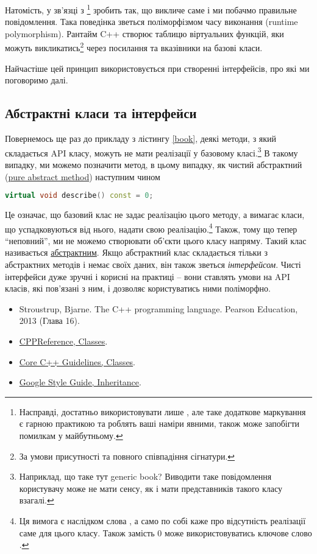 \documentclass[12pt]{article}
\begin{document}
	Натомість,  у зв'язці з \footnote{Насправді, достатньо використовувати лише , але таке додаткове маркування є гарною практикою та роблять ваші наміри явними, також може запобігти помилкам у майбутньому.} зробить так, що  викличе саме  і ми побачмо правильне повідомлення. Така поведінка зветься поліморфізмом часу виконання (runtime polymorphism). Рантайм C++ створює таблицю віртуальних функцій, яки можуть викликатись\footnote{За умови присутності  та повного співпадіння сігнатури.} через посилання та вказівники на базові класи.

	Найчастіше цей принцип використовується при створенні інтерфейсів, про які ми поговоримо далі.

	\subsection{Абстрактні класи та інтерфейси}
	Повернемось ще раз до прикладу з лістингу \ref{book}, деякі методи, з який складається API класу, можуть не мати реалізації у базовому класі.\footnote{Наприклад, що таке тут generic book? Виводити таке повідомлення користувачу може не мати сенсу, як і мати представників такого класу взагалі.} В такому випадку, ми можемо позначити метод,  в цьому випадку, як чистий абстрактний (\href{https://en.cppreference.com/book/intro/abstract_classes}{pure abstract method}) наступним чином
	\begin{lstlisting}[language=c++]
		virtual void describe() const = 0;
	\end{lstlisting}

	Це означає, що базовий клас  не задає реалізацію цього методу, а вимагає класи, що успадковуються від нього, надати свою реалізацію.\footnote{Ця вимога є наслідком слова , а  само по собі каже про відсутність реалізації саме для цього класу. Також замість 0 може використовуватись ключове слово .} Також, тому що  тепер ``неповний'', ми не можемо створювати об'єкти цього класу напряму. Такий клас називається \href{https://en.cppreference.com/w/cpp/language/abstract_class}{абстрактним}. Якщо абстрактний клас складається тільки з абстрактних методів і немає своїх даних, він також зветься \textit{інтерфейсом}. Чисті інтерфейси дуже зручні і корисні на практиці -- вони ставлять умови на API класів, які пов'язані з ним, і дозволяє користуватись ними поліморфно.

	
	\begin{itemize}
		\item Stroustrup, Bjarne. The C++ programming language. Pearson Education, 2013 (Глава 16).
		\item \href{https://en.cppreference.com/w/cpp/language/classes}{CPPReference, Classes}.
		\item \href{https://isocpp.github.io/CppCoreGuidelines/CppCoreGuidelines#c-classes-and-class-hierarchies}{Core C++ Guidelines, Classes}.
		\item \href{https://google.github.io/styleguide/cppguide.html#Inheritance}{Google Style Guide, Inheritance}.
	\end{itemize}
\end{document}
